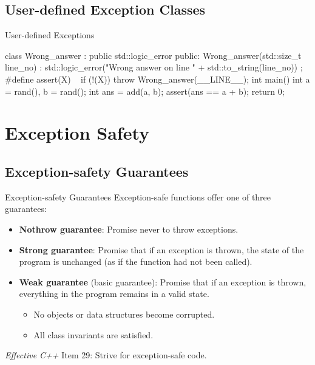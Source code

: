\documentclass{beamer}
\begin{document}
\subsection{User-defined Exception Classes}

\begin{frame}[fragile]{User-defined Exceptions}
    \begin{cpp}
class Wrong_answer : public std::logic_error {
 public:
  Wrong_answer(std::size_t line_no)
      : std::logic_error("Wrong answer on line "
          + std::to_string(line_no)) {}
};
#define assert(X)                          \
  { if (!(X)) throw Wrong_answer(__LINE__); }
int main() {
  int a = rand(), b = rand();
  int ans = add(a, b);
  assert(ans == a + b);
  return 0;
}
    \end{cpp}
\end{frame}

\section{Exception Safety}

\subsection{Exception-safety Guarantees}

\begin{frame}{Exception-safety Guarantees}
    Exception-safe functions offer one of three guarantees:
    \begin{itemize}
        \item \textbf{Nothrow guarantee}: Promise never to throw exceptions.
        \item \textbf{Strong guarantee}: Promise that if an exception is thrown, the state of the program is unchanged (as if the function had not been called).
        \item \textbf{Weak guarantee} (basic guarantee): Promise that if an exception is thrown, everything in the program remains in a valid state.
        \begin{itemize}
            \item No objects or data structures become corrupted.
            \item All class invariants are satisfied.
        \end{itemize}
    \end{itemize}
    \textit{Effective C++} Item 29: Strive for exception-safe code.
\end{frame}
\end{document}
